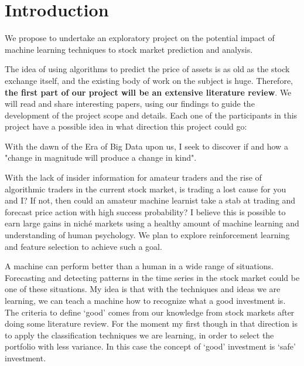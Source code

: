 \documentclass{article}
\begin{document}

\flushleft
\section*{Introduction}

We propose to undertake an exploratory project on the potential impact of machine learning techniques to stock market prediction and analysis. 

The idea of using algorithms to predict the price of assets is as old as the stock exchange itself, and the existing body of work on the subject is huge. Therefore, \textbf
{the first part of our project will be an extensive literature review}. We will read and share interesting papers, using our findings to guide the development of the project scope and details.
\newline
Each one of the participants in this project have a possible idea in what direction this project could go:

 With the dawn of the Era of Big Data upon us, I seek to discover if and how a "change in magnitude will produce a change in kind".

 With the lack of insider information for amateur traders and the rise of algorithmic traders in the current stock market, is trading a lost cause for you and I? If not, then could an amateur machine learnist take a stab at trading and forecast price action with high success probability? I believe this is possible to earn large gains in nich\'{e} markets using a healthy amount of machine learning and understanding of human psychology. We plan to explore reinforcement learning and feature selection to achieve such a goal.

 A machine can perform better than a human in a wide range of situations. Forecasting and detecting patterns in the time series in the stock market could be one of these situations.
My idea is that with the techniques and ideas we are learning, we can teach a machine how to recognize what a good investment is. The criteria to define `good' comes from our knowledge 
from stock markets after doing some literature review. For the moment my first though in that direction is to apply the classification techniques we are learning,  in order to select the portfolio
with less variance. In this case the concept of `good' investment is `safe' investment.
\newline
\end{document}
